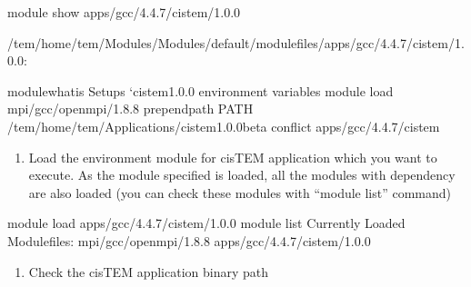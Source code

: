 \documentclass[letterpaper,10pt,english]{sphinxmanual}
\begin{document}
\begin{sphinxVerbatim}[commandchars=\\\{\}]
\PYGZdl{}\PYGZgt{} module show apps/gcc/4.4.7/cistem/1.0.0

\PYGZhy{}\PYGZhy{}\PYGZhy{}\PYGZhy{}\PYGZhy{}\PYGZhy{}\PYGZhy{}\PYGZhy{}\PYGZhy{}\PYGZhy{}\PYGZhy{}\PYGZhy{}\PYGZhy{}\PYGZhy{}\PYGZhy{}\PYGZhy{}\PYGZhy{}\PYGZhy{}\PYGZhy{}\PYGZhy{}\PYGZhy{}\PYGZhy{}\PYGZhy{}\PYGZhy{}\PYGZhy{}\PYGZhy{}\PYGZhy{}\PYGZhy{}\PYGZhy{}\PYGZhy{}\PYGZhy{}\PYGZhy{}\PYGZhy{}\PYGZhy{}\PYGZhy{}\PYGZhy{}\PYGZhy{}\PYGZhy{}\PYGZhy{}\PYGZhy{}\PYGZhy{}\PYGZhy{}\PYGZhy{}\PYGZhy{}\PYGZhy{}\PYGZhy{}\PYGZhy{}\PYGZhy{}\PYGZhy{}\PYGZhy{}\PYGZhy{}\PYGZhy{}\PYGZhy{}\PYGZhy{}\PYGZhy{}\PYGZhy{}\PYGZhy{}\PYGZhy{}\PYGZhy{}\PYGZhy{}\PYGZhy{}\PYGZhy{}\PYGZhy{}\PYGZhy{}\PYGZhy{}\PYGZhy{}\PYGZhy{}
/tem/home/tem/Modules/Modules/default/modulefiles/apps/gcc/4.4.7/cistem/1.0.0:

module\PYGZhy{}whatis    Setups {}`cistem\PYGZhy{}1.0.0\PYGZsq{} environment variables
module           load mpi/gcc/openmpi/1.8.8
prepend\PYGZhy{}path     PATH /tem/home/tem/\PYGZus{}Applications/cistem\PYGZhy{}1.0.0\PYGZhy{}beta
conflict         apps/gcc/4.4.7/cistem
\PYGZhy{}\PYGZhy{}\PYGZhy{}\PYGZhy{}\PYGZhy{}\PYGZhy{}\PYGZhy{}\PYGZhy{}\PYGZhy{}\PYGZhy{}\PYGZhy{}\PYGZhy{}\PYGZhy{}\PYGZhy{}\PYGZhy{}\PYGZhy{}\PYGZhy{}\PYGZhy{}\PYGZhy{}\PYGZhy{}\PYGZhy{}\PYGZhy{}\PYGZhy{}\PYGZhy{}\PYGZhy{}\PYGZhy{}\PYGZhy{}\PYGZhy{}\PYGZhy{}\PYGZhy{}\PYGZhy{}\PYGZhy{}\PYGZhy{}\PYGZhy{}\PYGZhy{}\PYGZhy{}\PYGZhy{}\PYGZhy{}\PYGZhy{}\PYGZhy{}\PYGZhy{}\PYGZhy{}\PYGZhy{}\PYGZhy{}\PYGZhy{}\PYGZhy{}\PYGZhy{}\PYGZhy{}\PYGZhy{}\PYGZhy{}\PYGZhy{}\PYGZhy{}\PYGZhy{}\PYGZhy{}\PYGZhy{}\PYGZhy{}\PYGZhy{}\PYGZhy{}\PYGZhy{}\PYGZhy{}\PYGZhy{}\PYGZhy{}\PYGZhy{}\PYGZhy{}\PYGZhy{}\PYGZhy{}\PYGZhy{}
\end{sphinxVerbatim}
\begin{enumerate}
\def\theenumi{\arabic{enumi}}
\def\labelenumi{\theenumi .}
\makeatletter\def\p@enumii{\p@enumi \theenumi .}\makeatother
\setcounter{enumi}{2}
\item {} 
Load the environment module for cisTEM  application which you want to execute. As the module specified is loaded, all the modules with dependency are also loaded (you can check these modules with “module list” command)

\end{enumerate}

\begin{sphinxVerbatim}[commandchars=\\\{\}]
\PYGZdl{}\PYGZgt{} module load apps/gcc/4.4.7/cistem/1.0.0
\PYGZdl{}\PYGZgt{} module list
Currently Loaded Modulefiles:
   mpi/gcc/openmpi/1.8.8          apps/gcc/4.4.7/cistem/1.0.0
\end{sphinxVerbatim}
\begin{enumerate}
\def\theenumi{\arabic{enumi}}
\def\labelenumi{\theenumi .}
\makeatletter\def\p@enumii{\p@enumi \theenumi .}\makeatother
\setcounter{enumi}{3}
\item {} 
Check the cisTEM application binary path

\end{enumerate}
\end{document}
